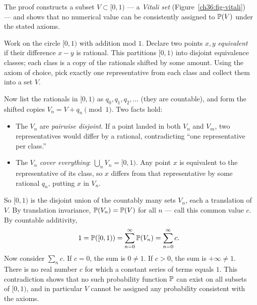 \begin{whybox}
The proof constructs a subset $V \subset [0,1)$ --- a \emph{Vitali set} (Figure~\ref{ch36:fig-vitali}) --- and
shows that no numerical value can be consistently assigned to $\P(V)$ under the stated axioms.

Work on the circle $[0,1)$ with addition mod $1$. Declare two points $x,y$
\emph{equivalent} if their difference $x-y$ is rational. This partitions $[0,1)$ into
disjoint equivalence classes; each class is a copy of the rationals shifted by
some amount. Using the axiom of choice, pick exactly one representative from each
class and collect them into a set $V$.

Now list the rationals in $[0,1)$ as $q_0, q_1, q_2, \dots$ (they are countable),
and form the shifted copies $V_n = V + q_n \pmod 1$. Two facts hold:

\begin{itemize}
  \item The $V_n$ are \emph{pairwise disjoint}. If a point landed in both $V_n$
        and $V_m$, two representatives would differ by a rational, contradicting
        ``one representative per class.''
  \item The $V_n$ \emph{cover everything}: $\bigcup_n V_n = [0,1)$. Any point $x$
        is equivalent to the representative of its class, so $x$ differs from that
        representative by some rational $q_n$, putting $x$ in $V_n$.
\end{itemize}

So $[0,1)$ is the disjoint union of the countably many sets $V_n$, each a translation
of $V$. By translation invariance, $\P(V_n) = \P(V)$ for all $n$ --- call
this common value $c$. By countable additivity,
\[
  1 = \P([0,1)) = \sum_{n=0}^{\infty} \P(V_n) = \sum_{n=0}^{\infty} c .
\]
Now consider $\sum_n c$. If $c = 0$, the sum is $0 \ne 1$. If $c > 0$, the sum is
$+\infty \ne 1$. There is no real number $c$ for which a constant series of terms
equals $1$. This contradiction shows that no such probability function $\P$ can exist on all
subsets of $[0,1)$, and in particular $V$ cannot be assigned any probability consistent
with the axioms.
\end{whybox}

